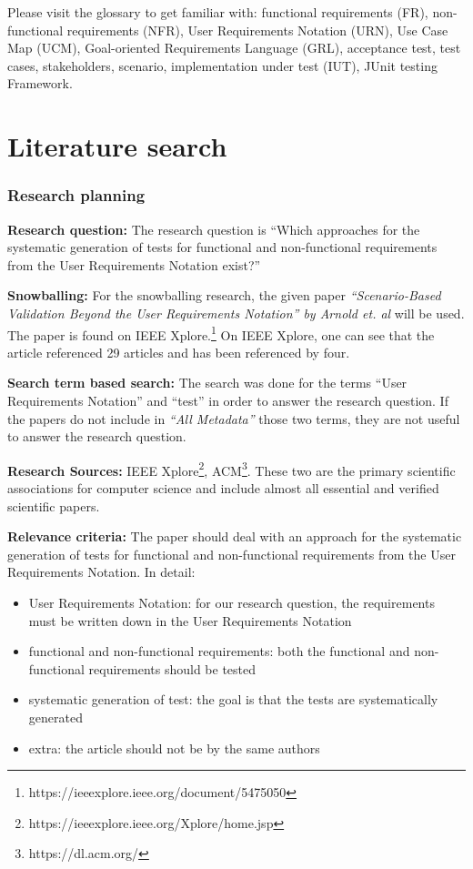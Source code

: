 Please visit the glossary to get familiar with: functional requirements (FR), non-functional requirements (NFR), User Requirements Notation (URN), Use Case Map (UCM), Goal-oriented Requirements Language (GRL), acceptance test, test cases, stakeholders, scenario, implementation under test (IUT), JUnit testing Framework.
\section{Literature search}
\label{topic08:sectionLiteratur}

\subsubsection{Research planning} 

\textbf{Research question:} The research question is \enquote{Which approaches for the systematic generation of tests for functional and non-functional requirements from the User Requirements Notation exist?}

\textbf{Snowballing:} For the snowballing research, the given paper \textit{\enquote{Scenario-Based Validation Beyond the User Requirements Notation} by Arnold et. al} will be used. The paper is found on IEEE Xplore.\footnote{https://ieeexplore.ieee.org/document/5475050} On IEEE Xplore, one can see that the article referenced 29 articles and has been referenced by four. 

\textbf{Search term based search:} The search was done for the terms \enquote{User Requirements Notation} and \enquote{test} in order to answer the research question. If the papers do not include in \textit{\enquote{All Metadata}} those two terms, they are not useful to answer the research question.

\textbf{Research Sources:} IEEE Xplore\footnote{https://ieeexplore.ieee.org/Xplore/home.jsp}, ACM\footnote{https://dl.acm.org/}. These two are the primary scientific associations for computer science and include almost all essential and verified scientific papers.

\textbf{Relevance criteria:} The paper should deal with an approach for the systematic generation of tests for functional and non-functional requirements from the User Requirements Notation. In detail:
\begin{itemize}
	\itemsep-1em
	\item User Requirements Notation: for our research question, the requirements must be written down in the User Requirements Notation
	\item functional and non-functional requirements: both the functional and non-functional requirements should be tested 
	\item systematic generation of test: the goal is that the tests are systematically generated
	\item extra: the article should not be by the same authors
\end{itemize}

